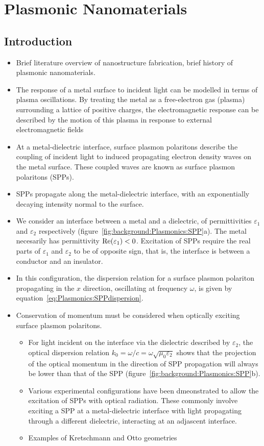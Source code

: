 \chapter{Plasmonic Nanomaterials}\label{sec:background:Plasmonics}

\section{Introduction}
\begin{itemize}
    \item Brief literature overview of nanostructure fabrication, brief history of plasmonic nanomaterials.
    \item The response of a metal surface to incident light can be modelled in terms of plasma oscillations. By treating the metal as a free-electron gas (plasma) surrounding a lattice of positive charges, the electromagnetic response can be described by the motion of this plasma in response to external electromagnetic fields
    \item At a metal-dielectric interface, surface plasmon polaritons describe the coupling of incident light to induced propagating electron density waves on the metal surface. These coupled waves are known as surface plasmon polaritons (SPPs).
    \item SPPs propagate along the metal-dielectric interface, with an exponentially decaying intensity normal to the surface.
    \item We consider an interface between a metal and a dielectric, of permittivities $\varepsilon_1$ and $\varepsilon_2$ respectively (figure~\ref{fig:background:Plasmonics:SPP}a). The metal necesarily has permittivity ${\mathop{\rm Re}\nolimits}(\varepsilon_1)<0$. Excitation of SPPs require the real parts of $\varepsilon_1$ and $\varepsilon_2$ to be of opposite sign, that is, the interface is between a conductor and an insulator.
    \item In this configuration, the dispersion relation for a surface plasmon polariton propagating in the $x$ direction, oscillating at frequency $\omega$, is given by equation~\ref{eq:Plasmonics:SPPdispersion}.
    \item Conservation of momentum must be considered when optically exciting surface plasmon polaritons.
    \begin{itemize}
        \item For light incident on the interface via the dielectric described by $\varepsilon_2$, the optical dispersion relation $k_0 = \omega / c = \omega \sqrt{\mu_0 \varepsilon_2}$ shows that the projection of the optical momentum in the direction of SPP propagation will always be lower than that of the SPP (figure~\ref{fig:background:Plasmonics:SPP}b).
        \item Various experimental configurations have been dmeonstrated to allow the excitation of SPPs with optical radiation. These commonly involve exciting a SPP at a metal-dielectric interface with light propagating through a different dielectric, interacting at an adjascent interface.
        \item Examples of Kretschmann and Otto geometries
    \end{itemize}
\end{itemize}

